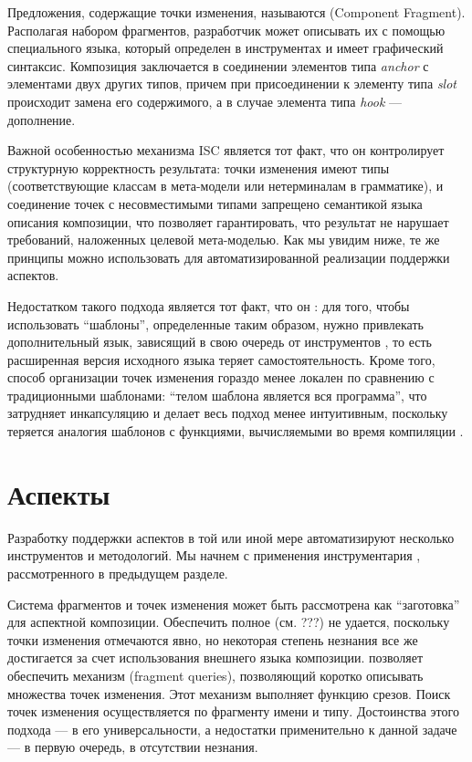 Предложения, содержащие точки изменения, называются  (Component Fragment). Располагая набором фрагментов, разработчик может описывать их  с помощью специального языка, который определен в инструментах  и имеет графический синтаксис. Композиция заключается в соединении элементов типа \emph{anchor} с элементами двух других типов, причем при присоединении к элементу типа \emph{slot} происходит замена его содержимого, а в случае элемента типа \emph{hook} --- дополнение.

Важной особенностью механизма ISC является тот факт, что он контролирует структурную корректность результата: точки изменения имеют типы (соответствующие классам в мета-модели или нетерминалам в грамматике), и соединение точек с несовместимыми типами запрещено семантикой языка описания композиции, что позволяет гарантировать, что результат не нарушает требований, наложенных целевой мета-моделью. Как мы увидим ниже, те же принципы можно использовать для автоматизированной реализации поддержки аспектов.

Недостатком такого подхода является тот факт, что он : для того, чтобы использовать ``шаблоны'', определенные таким образом, нужно привлекать дополнительный язык, зависящий в свою очередь от инструментов , то есть расширенная версия исходного языка теряет самостоятельность. Кроме того, способ организации точек изменения гораздо менее локален по сравнению с традиционными шаблонами: ``телом шаблона является вся программа'', что затрудняет инкапсуляцию и делает весь подход менее интуитивным, поскольку теряется аналогия шаблонов с функциями, вычисляемыми во время компиляции \cite{MacroML}.

\section{Аспекты}

Разработку поддержки аспектов в той или иной мере автоматизируют несколько инструментов и методологий. Мы начнем с применения инструментария , рассмотренного в предыдущем разделе.

Система фрагментов и точек изменения может быть рассмотрена как ``заготовка'' для аспектной композиции. Обеспечить полное  (см. ???) не удается, поскольку точки изменения отмечаются явно, но некоторая степень незнания все же достигается за счет использования внешнего языка композиции.  позволяет обеспечить механизм  (fragment queries), позволяющий коротко описывать множества точек изменения. Этот механизм выполняет функцию срезов. Поиск точек изменения осуществляется по фрагменту имени и типу.  Достоинства этого подхода --- в его универсальности, а недостатки применительно к данной задаче --- в первую очередь, в отсутствии незнания.

